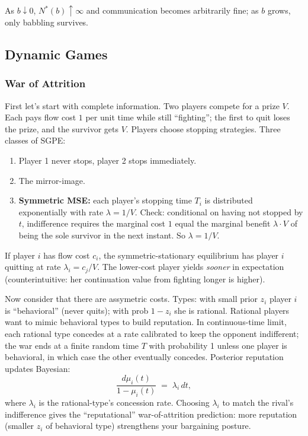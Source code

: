 \documentclass[11pt,english]{article}
\begin{document}
As $b\downarrow 0$, $N^*(b)\uparrow\infty$ and communication becomes arbitrarily fine; as $b$ grows, only babbling survives.

\subsection{Dynamic Games}

\subsubsection{War of Attrition}
First let's start with complete information. Two players compete for a prize $V$. Each pays flow cost $1$ per unit time while still ``fighting''; the first to quit loses the prize, and the survivor gets $V$. Players choose stopping strategies. Three classes of SGPE:
\begin{enumerate}[label=(\roman*),leftmargin=*]
  \item Player 1 never stops, player 2 stops immediately.
  \item The mirror-image.
  \item \textbf{Symmetric MSE:} each player's stopping time $T_i$ is distributed exponentially with rate $\lambda = 1/V$. Check: conditional on having not stopped by $t$, indifference requires the marginal cost $1$ equal the marginal benefit $\lambda\cdot V$ of being the sole survivor in the next instant. So $\lambda=1/V$.
\end{enumerate}

\begin{proposition}
If player $i$ has flow cost $c_i$, the symmetric-stationary equilibrium has player $i$ quitting at rate $\lambda_i=c_j/V$. The lower-cost player yields \emph{sooner} in expectation (counterintuitive: her continuation value from fighting longer is higher).
\end{proposition}

Now consider that there are assymetric costs. Types: with small prior $z_i$ player $i$ is ``behavioral'' (never quits); with prob $1-z_i$ she is rational. Rational players want to mimic behavioral types to build reputation. In continuous-time limit, each rational type concedes at a rate calibrated to keep the opponent indifferent; the war ends at a finite random time $T$ with probability 1 unless one player is behavioral, in which case the other eventually concedes. Posterior reputation updates Bayesian:
$$\frac{d\mu_i(t)}{1-\mu_i(t)} \;=\; \lambda_i\,dt,$$
where $\lambda_i$ is the rational-type's concession rate. Choosing $\lambda_i$ to match the rival's indifference gives the ``reputational'' war-of-attrition prediction: more reputation (smaller $z_i$ of behavioral type) strengthens your bargaining posture.
\end{document}
